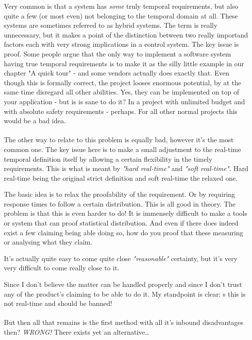 Very common is that a system has \textit{some} truly temporal requirements, but also quite a few (or most even) not belonging to the temporal domain at all. These systems are sometimes referred to as hybrid systems. The term is really unnecessary, but it makes a point of the distinction between two really importand factors each with very strong implications in a control system. 
The key issue is proof. Some people argue that the only way to implement a software system having true temporal requirements is to make it as the silly little example in our chapter "A quick tour" - and some vendors actually does exactly that. Even though this is formally correct, the project looses enormous potential, by at the same time disregard all other abilities. Yes, they can be implemented on top of your application - but is is sane to do it? In a project with unlimited budget and with absolute safety requirements - perhaps. For all other normal projects this would be a bad idea.
\\\\
The other way to relate to this problem is equally bad, however it's the most common one. The key issue here is to make a small adjustment to the real-time temporal definition itself by allowing a certain flexibility in the timely requirements. This is what is meant by \textit{"hard real-time"} and \textit{"soft real-time"}. Hard real-time being the original strict definition and soft real-time the relaxed one.

The basic idea is to relax the proofability of the requirement. Or by requiring response times to follow a certain distribution. This is all good in theory. The problem is that this is even harder to do! It is immensely difficult to make a tools or system that can proof statistical distribution. And even if there does indeed exist a few claiming being able doing so, how do you proof that these measuring or analysing what they claim. 

It's actually quite easy to come quite close \textit{"reasonable"} certainty, but it's very very difficult to come really close to it.

Since I don't believe the matter can be handled properly and since I don't trust any of the product's claiming to be able to do it. My standpoint is clear: s this is not real-time and should be banned!
\\\\
But then all that remains is the first method with all it's inbound disadvantages then? \textit{WRONG!} There exists yet an alternative\ldots

